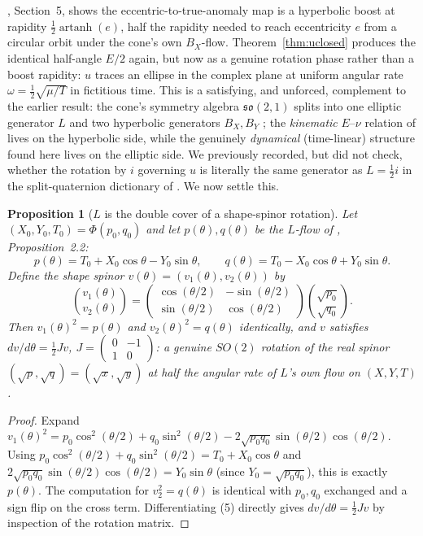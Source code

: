 \documentclass[12pt]{amsart}
\theoremstyle{plain}
\newtheorem{proposition}[theorem]{Proposition}
\theoremstyle{remark}
\begin{document}
\cite{Ebert2026Clock}, Section~5, shows the eccentric-to-true-anomaly map is a hyperbolic boost at rapidity $\tfrac12\operatorname{artanh}(e)$, half the rapidity needed to reach eccentricity $e$ from a circular orbit under the cone's own $B_X$-flow. Theorem~\ref{thm:uclosed} produces the identical half-angle $E/2$ again, but now as a genuine rotation phase rather than a boost rapidity: $u$ traces an ellipse in the complex plane at uniform angular rate $\omega=\tfrac12\sqrt{\mu/T}$ in fictitious time. This is a satisfying, and unforced, complement to the earlier result: the cone's symmetry algebra $\mathfrak{so}(2,1)$ splits into one elliptic generator $L$ and two hyperbolic generators $B_X,B_Y$ \cite{Ebert2026EigenCoord}; the \emph{kinematic} $E$--$\nu$ relation of \cite{Ebert2026Clock} lives on the hyperbolic side, while the genuinely \emph{dynamical} (time-linear) structure found here lives on the elliptic side. We previously recorded, but did not check, whether the rotation by $i$ governing $u$ is literally the same generator as $L=\tfrac12i$ in the split-quaternion dictionary of \cite{Ebert2026Clock}. We now settle this.

\begin{proposition}[$L$ is the double cover of a shape-spinor rotation]\label{prop:Lspinor}
Let $(X_0,Y_0,T_0)=\Phi(p_0,q_0)$ and let $p(\theta),q(\theta)$ be the $L$-flow of \cite{Ebert2026EigenCoord}, Proposition~2.2:
\[
p(\theta)=T_0+X_0\cos\theta-Y_0\sin\theta,\qquad q(\theta)=T_0-X_0\cos\theta+Y_0\sin\theta.
\]
Define the shape spinor $v(\theta)=(v_1(\theta),v_2(\theta))$ by
\begin{equation}
\binom{v_1(\theta)}{v_2(\theta)} = \begin{pmatrix}\cos(\theta/2) & -\sin(\theta/2)\\ \sin(\theta/2) & \cos(\theta/2)\end{pmatrix}\binom{\sqrt{p_0}}{\sqrt{q_0}}. \tag{5}
\end{equation}
Then $v_1(\theta)^2=p(\theta)$ and $v_2(\theta)^2=q(\theta)$ identically, and $v$ satisfies $dv/d\theta=\tfrac12Jv$, $J=\begin{pmatrix}0&-1\\1&0\end{pmatrix}$: a genuine $SO(2)$ rotation of the real spinor $(\sqrt p,\sqrt q)=(\sqrt x,\sqrt y)$ at \emph{half} the angular rate of $L$'s own flow on $(X,Y,T)$.
\end{proposition}

\begin{proof}
Expand $v_1(\theta)^2=p_0\cos^2(\theta/2)+q_0\sin^2(\theta/2)-2\sqrt{p_0q_0}\sin(\theta/2)\cos(\theta/2)$. Using $p_0\cos^2(\theta/2)+q_0\sin^2(\theta/2)=T_0+X_0\cos\theta$ and $2\sqrt{p_0q_0}\sin(\theta/2)\cos(\theta/2)=Y_0\sin\theta$ (since $Y_0=\sqrt{p_0q_0}$), this is exactly $p(\theta)$. The computation for $v_2^2=q(\theta)$ is identical with $p_0,q_0$ exchanged and a sign flip on the cross term. Differentiating (5) directly gives $dv/d\theta=\tfrac12Jv$ by inspection of the rotation matrix. \qedhere
\end{proof}
\end{document}

